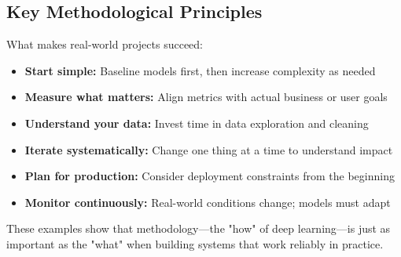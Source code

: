 \subsection{Key Methodological Principles}

What makes real-world projects succeed:
\begin{itemize}
    \item \textbf{Start simple:} Baseline models first, then increase complexity as needed
    \item \textbf{Measure what matters:} Align metrics with actual business or user goals
    \item \textbf{Understand your data:} Invest time in data exploration and cleaning
    \item \textbf{Iterate systematically:} Change one thing at a time to understand impact
    \item \textbf{Plan for production:} Consider deployment constraints from the beginning
    \item \textbf{Monitor continuously:} Real-world conditions change; models must adapt
\end{itemize}

These examples show that methodology—the "how" of deep learning—is just as important as the "what" when building systems that work reliably in practice.

